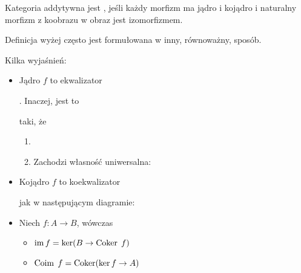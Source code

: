 \begin{definition}
  Kategoria addytywna jest , jeśli każdy morfizm ma jądro i kojądro i naturalny morfizm z koobrazu w obraz jest izomorfizmem.
\end{definition}

Definicja wyżej często jest formułowana w inny, równoważny, sposób.

Kilka wyjaśnień:
\begin{itemize}
  \item Jądro $f$ to ekwalizator . Inaczej, jest to  taki, że
    \begin{enumerate}
      \item {}
      \item Zachodzi własność uniwersalna:
        \begin{center}\end{center}
    \end{enumerate}
  \item Kojądro $f$ to koekwalizator  jak w następującym diagramie:
    \begin{center}\end{center}
  \item Niech $f:A\to B$, wówczas
    \begin{itemize}
      \item $\operatorname{im} f=\ker(B\to \operatorname{Coker}\;f)$
      \item $\operatorname{Coim}\;f=\operatorname{Coker}(\ker f\to A)$
    \end{itemize}


\end{itemize}
